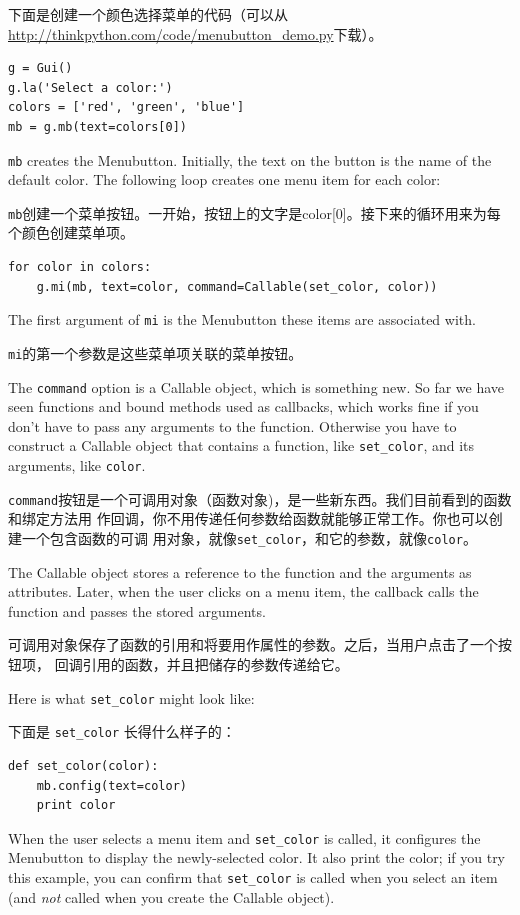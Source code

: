 \documentclass[10pt]{book}
\begin{document}
\begin{CJK}{UTF8}{gbsn}
下面是创建一个颜色选择菜单的代码（可以从
\url{http://thinkpython.com/code/menubutton_demo.py}下载）。

\begin{verbatim}
g = Gui()
g.la('Select a color:')
colors = ['red', 'green', 'blue']
mb = g.mb(text=colors[0])
\end{verbatim}
%
{\tt mb} creates the Menubutton.  Initially, the text on the button is
the name of the default color.  The following loop creates one menu
item for each color:

{\tt mb}创建一个菜单按钮。一开始，按钮上的文字是color[0]。接下来的循环用来为每
个颜色创建菜单项。

\begin{verbatim}
for color in colors:
    g.mi(mb, text=color, command=Callable(set_color, color))
\end{verbatim}
%
The first argument of {\tt mi} is the Menubutton these items are
associated with.

{\tt mi}的第一个参数是这些菜单项关联的菜单按钮。

The {\tt command} option is a Callable object, which is something new.
So far we have seen functions and bound methods used as callbacks,
which works fine if you don't have to pass any arguments to
the function.  Otherwise you have to construct a Callable object
that contains a function, like \verb"set_color", and its arguments,
like {\tt color}.

{\tt command}按钮是一个可调用对象（函数对象)，是一些新东西。我们目前看到的函数和绑定方法用
作回调，你不用传递任何参数给函数就能够正常工作。你也可以创建一个包含函数的可调
用对象，就像\verb"set_color"，和它的参数，就像{\tt color}。

The Callable object stores a reference to the function and the
arguments as attributes.  Later, when the user clicks on a menu
item, the callback calls the function and passes the stored
arguments.

可调用对象保存了函数的引用和将要用作属性的参数。之后，当用户点击了一个按钮项，
回调引用的函数，并且把储存的参数传递给它。

Here is what \verb"set_color" might look like:

下面是 \verb"set_color" 长得什么样子的：

\begin{verbatim}
def set_color(color):
    mb.config(text=color)
    print color
\end{verbatim}
%
When the user selects a menu item and \verb"set_color" is called,
it configures the Menubutton to display the newly-selected color.
It also print the color; if you try this example, you can confirm that
\verb"set_color" is called when you select an item (and {\em not}
called when you create the Callable object).


\end{CJK}
\end{document}
